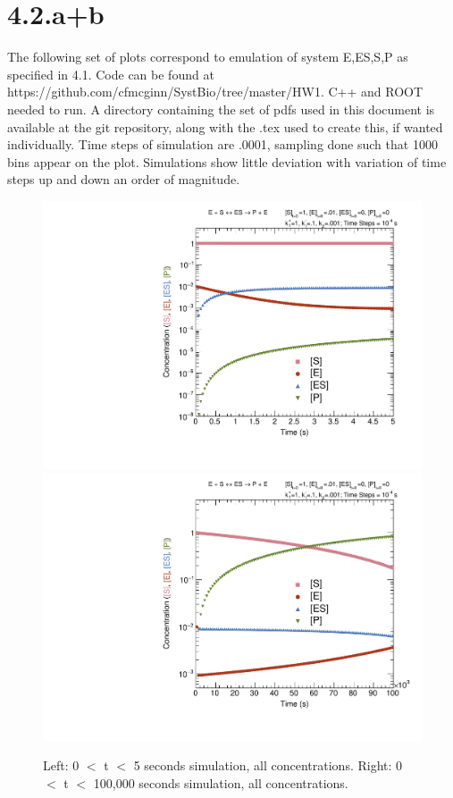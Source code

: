 \documentclass{article}
\begin{document}
\section{4.2.a+b}

The following set of plots correspond to emulation of system E,ES,S,P as specified in 4.1. Code can be found at https://github.com/cfmcginn/SystBio/tree/master/HW1. C++ and ROOT needed to run. A directory containing the set of pdfs used in this document is available at the git repository, along with the .tex used to create this, if wanted individually. Time steps of simulation are .0001, sampling done such that 1000 bins appear on the plot. Simulations show little deviation with variation of time steps up and down an order of magnitude.

\begin{figure}[H]
    \centering
    \includegraphics[width=.49\textwidth]{canv5_c.pdf} 
    \includegraphics[width=.49\textwidth]{canv100k_c.pdf}
    \caption{Left: 0 $<$ t $<$ 5 seconds simulation, all concentrations. Right: 0 $<$ t $<$ 100,000 seconds simulation, all concentrations.}
    \label{}
\end{figure}
\end{document}
